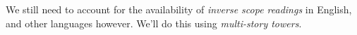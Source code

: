 \documentclass[nols,nofonts,nobib,nohyper]{tufte-book}
\begin{document}
We still need to account for the availability of \textit{inverse scope readings}
in English, and other languages however. We'll do this using \textit{multi-story
towers}.













\end{document}
